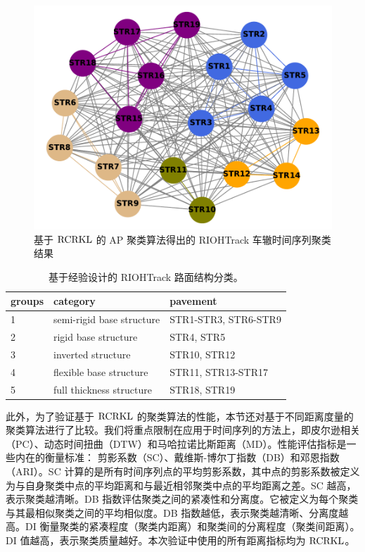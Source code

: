 \begin{figure}[htbp]
\begin{center}
\includegraphics[scale=0.5]{./ch2/fig2_9.pdf}
\caption{基于 $\rm{RCRKL}$ 的 AP 聚类算法得出的 RIOHTrack 车辙时间序列聚类结果} \label{fig3}
\end{center}
\end{figure}

\begin{table}[!ht]
\fontsize{8}{14}\selectfont
\centering
\caption{基于经验设计的 RIOHTrack 路面结构分类。}
\begin{tabular}{lll}
 \hline
 groups &  category & pavement\\
  \hline
  1 &  semi-rigid base structure & STR1-STR3, STR6-STR9\\
  \hline
  2 &  rigid base structure & STR4, STR5\\
  \hline
  3 &  inverted structure & STR10, STR12\\
  \hline
  4 &  flexible base structure & STR11, STR13-STR17\\
  \hline
  5 &  full thickness structure & STR18, STR19\\
  \hline
\end{tabular}
\label{table1}
\end{table}

此外，为了验证基于 $\rm{RCRKL}$ 的聚类算法的性能，本节还对基于不同距离度量的聚类算法进行了比较。我们将重点限制在应用于时间序列的方法上，即皮尔逊相关（PC）\cite{30}、动态时间扭曲（DTW）\cite{31}和马哈拉诺比斯距离（MD）\cite{32}。性能评估指标是一些内在的衡量标准： 剪影系数（SC）、戴维斯-博尔丁指数（DB）和邓恩指数（ARI）。SC 计算的是所有时间序列点的平均剪影系数，其中点的剪影系数被定义为与自身聚类中点的平均距离和与最近相邻聚类中点的平均距离之差。SC 越高，表示聚类越清晰。DB 指数评估聚类之间的紧凑性和分离度。它被定义为每个聚类与其最相似聚类之间的平均相似度。DB 指数越低，表示聚类越清晰、分离度越高。DI 衡量聚类的紧凑程度（聚类内距离）和聚类间的分离程度（聚类间距离）。DI 值越高，表示聚类质量越好。本次验证中使用的所有距离指标均为 $\rm{RCRKL}$。

